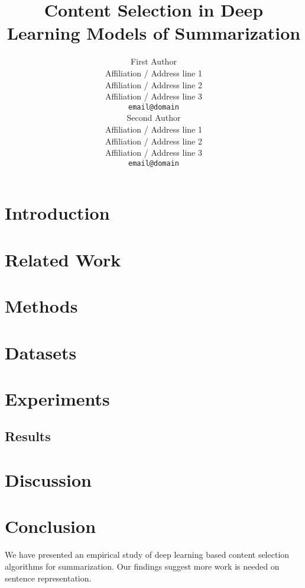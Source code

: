 \documentclass[11pt,a4paper]{article}
\title{Content Selection in Deep Learning Models of Summarization}
\author{First Author \\
  Affiliation / Address line 1 \\
  Affiliation / Address line 2 \\
  Affiliation / Address line 3 \\
  {\tt email@domain} \\\And
  Second Author \\
  Affiliation / Address line 1 \\
  Affiliation / Address line 2 \\
  Affiliation / Address line 3 \\
  {\tt email@domain} \\}
\date{}
\begin{document}
\maketitle
\begin{abstract}
\end{abstract}



\section{Introduction}


\section{Related Work} \label{sec:related}


\section{Methods}


%



\section{Datasets}
\label{sec:datasets}






\section{Experiments} \label{sec:exps}


\subsection{Results} 


\section{Discussion}



\section{Conclusion}
We have presented an empirical study of deep learning based content selection
algorithms for summarization. Our findings suggest more work is needed 
on sentence representation.






\newpage
\onecolumn
\appendix



\makeappendix
\end{document}
